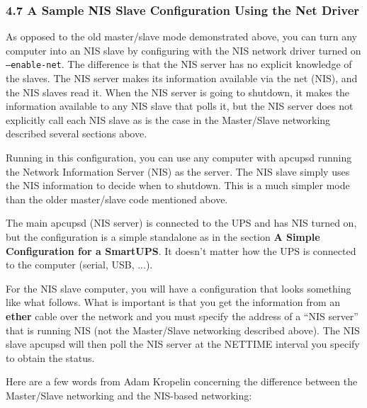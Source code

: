 \label{A-Sample-NIS-Slave-Configuration-Using-the-Net-Driver}

\subsubsection*{4.7 A Sample NIS Slave Configuration Using the Net Driver}

\label{index-Example_002c-NIS-slave-81}
\label{index-NIS-slave-conf-82}
\label{index-Configuration_002c-NIS-slave-conf-83}
As opposed to the old master/slave mode demonstrated above, you can turn any
computer into an NIS slave by configuring with the NIS network driver turned
on {\tt --enable-net}. The difference is that the NIS server has no explicit
knowledge of the slaves. The NIS server makes its information available via
the net (NIS), and the NIS slaves read it. When the NIS server is going to
shutdown, it makes the information available to any NIS slave that polls it,
but the NIS server does not explicitly call each NIS slave as is the case in
the Master/Slave networking described several sections above.  

Running in this configuration, you can use any computer with apcupsd running
the Network Information Server (NIS) as the server.  The NIS slave simply uses
the NIS information to decide when to shutdown.  This is a much simpler mode
than the older master/slave code mentioned above.  

The main apcupsd (NIS server) is connected to the UPS and has NIS turned on,
but the configuration is a simple standalone as in the section {\bf A Simple
Configuration for a SmartUPS}. It doesn't matter how the UPS is connected to
the computer (serial, USB, ...).  

For the NIS slave computer, you will have a configuration that looks something
like what follows.  What is important is that you get the information from an
{\bf ether} cable over the network and you must specify the address of a ``NIS
server'' that is running NIS (not the Master/Slave networking described
above). The NIS slave apcupsd will then poll the NIS server at the NETTIME
interval you specify to obtain the status.  

Here are a few words from Adam Kropelin concerning the difference between the
Master/Slave networking and the NIS-based networking:  

